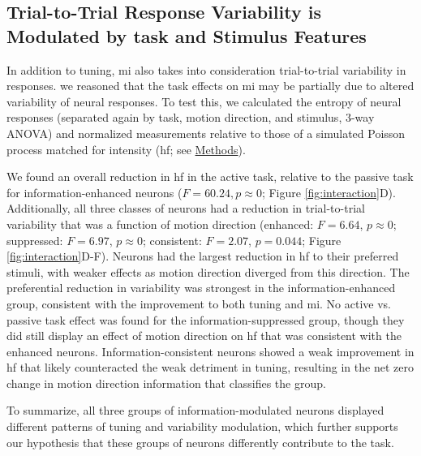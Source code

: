 \subsection*{Trial-to-Trial Response Variability is Modulated by task and Stimulus Features}
In addition to tuning, \gls{mi} also takes into consideration trial-to-trial variability in responses. we reasoned that the task effects on \gls{mi} may be partially due to altered variability of neural responses. To test this, we calculated the entropy of neural responses (separated again by task, motion direction, and stimulus, 3-way ANOVA) and normalized measurements relative to those of a simulated Poisson process matched for intensity (\gls{hf}; see \hyperref[{sec:methods}]{Methods}).

We found an overall reduction in \gls{hf} in the active task, relative to the passive task for information-enhanced neurons ($F=60.24, p \approx 0$; Figure \ref{fig:interaction}D). Additionally, all three classes of neurons had a reduction in trial-to-trial variability that was a function of motion direction (enhanced: $F=6.64$, $p \approx 0$; suppressed: $F=6.97$, $p \approx 0$; consistent: $F=2.07$, $p=0.044$; Figure \ref{fig:interaction}D-F). Neurons had the largest reduction in \gls{hf} to their preferred stimuli, with weaker effects as motion direction diverged from this direction. The preferential reduction in variability was strongest in the information-enhanced group, consistent with the improvement to both tuning and \gls{mi}. No active vs. passive task effect was found for the information-suppressed group, though they did still display an effect of motion direction on \gls{hf} that was consistent with the enhanced neurons. Information-consistent neurons showed a weak improvement in \gls{hf} that likely counteracted the weak detriment in tuning, resulting in the net zero change in motion direction information that classifies the group.

To summarize, all three groups of information-modulated neurons displayed different patterns of tuning and variability modulation, which further supports our hypothesis that these groups of neurons differently contribute to the task.


